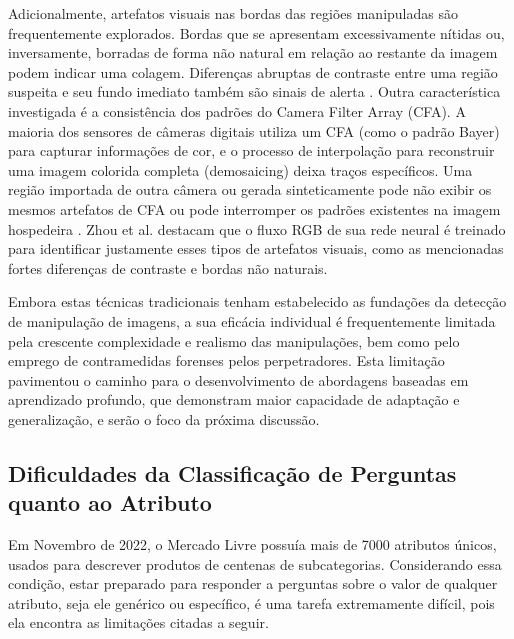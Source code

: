 Adicionalmente, artefatos visuais nas bordas das regiões manipuladas são frequentemente explorados. Bordas que se apresentam excessivamente nítidas ou, inversamente, borradas de forma não natural em relação ao restante da imagem podem indicar uma colagem. Diferenças abruptas de contraste entre uma região suspeita e seu fundo imediato também são sinais de alerta \cite{zhou2018manipulation}. Outra característica investigada é a consistência dos padrões do Camera Filter Array (CFA). A maioria dos sensores de câmeras digitais utiliza um CFA (como o padrão Bayer) para capturar informações de cor, e o processo de interpolação para reconstruir uma imagem colorida completa (demosaicing) deixa traços específicos. Uma região importada de outra câmera ou gerada sinteticamente pode não exibir os mesmos artefatos de CFA ou pode interromper os padrões existentes na imagem hospedeira \cite{zhou2018manipulation}. Zhou et al. \cite{zhou2018manipulation} destacam que o fluxo RGB de sua rede neural é treinado para identificar justamente esses tipos de artefatos visuais, como as mencionadas fortes diferenças de contraste e bordas não naturais.

Embora estas técnicas tradicionais tenham estabelecido as fundações da detecção de manipulação de imagens, a sua eficácia individual é frequentemente limitada pela crescente complexidade e realismo das manipulações, bem como pelo emprego de contramedidas forenses pelos perpetradores. Esta limitação pavimentou o caminho para o desenvolvimento de abordagens baseadas em aprendizado profundo, que demonstram maior capacidade de adaptação e generalização, e serão o foco da próxima discussão.

\subsection{Dificuldades da Classificação de Perguntas quanto ao Atributo}
\label{dificuldades da classificação de perguntas quanto ao atributo}
Em Novembro de 2022, o Mercado Livre possuía mais de 7000 atributos únicos, usados para descrever produtos de centenas de subcategorias. Considerando essa condição, estar preparado para responder a perguntas sobre o valor de qualquer atributo, seja ele genérico ou específico, é uma tarefa extremamente difícil, pois ela encontra as limitações citadas a seguir.

